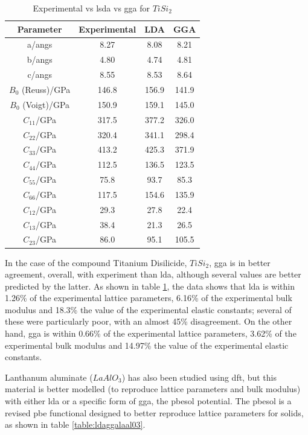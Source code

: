 \begin{table}[h]
\begin{center}
\renewcommand{\arraystretch}{1.2}
\begin{tabular}{c c c c}
\hline\hline
Parameter & Experimental & LDA & GGA  \\
\hline\hline
a/angs & 8.27 & 8.08 & 8.21 \\
b/angs & 4.80 & 4.74 & 4.81 \\
c/angs & 8.55 & 8.53 & 8.64 \\
$B_0$ (Reuss)/GPa & 146.8 & 156.9 & 141.9 \\
$B_0$ (Voigt)/GPa & 150.9 & 159.1 & 145.0 \\
$C_{11}$/GPa & 317.5 & 377.2 & 326.0 \\
$C_{22}$/GPa & 320.4 & 341.1 & 298.4 \\
$C_{33}$/GPa & 413.2 & 425.3 & 371.9 \\
$C_{44}$/GPa & 112.5 & 136.5 & 123.5 \\
$C_{55}$/GPa & 75.8 & 93.7 & 85.3 \\
$C_{66}$/GPa & 117.5 & 154.6 & 135.9 \\
$C_{12}$/GPa & 29.3 & 27.8 & 22.4 \\
$C_{13}$/GPa & 38.4 & 21.3 & 26.5 \\
$C_{23}$/GPa & 86.0 & 95.1 & 105.5 \\
\hline\hline
\end{tabular}
\end{center}
\caption{Experimental vs \acrshort{lsda} vs \acrshort{gga} for $TiSi_2$\cite{dftrfkj}}
\label{table:ldaggatisi2}
\end{table}

In the case of the compound Titanium Disilicide, $TiSi_2$, \acrshort{gga} is in better agreement, overall, with experiment than \acrshort{lda}, although several values are better predicted by the latter.  As shown in table \ref{table:ldaggatisi2}, the data shows that \acrshort{lda} is within 1.26\% of the experimental lattice parameters, 6.16\% of the experimental bulk modulus and 18.3\% the value of the experimental elastic constants; several of these were particularly poor, with an almost 45\% disagreement.  On the other hand, \acrshort{gga} is within 0.66\% of the experimental lattice parameters, 3.62\% of the experimental bulk modulus and 14.97\% the value of the experimental elastic constants\cite{dftrfkj}.

Lanthanum aluminate ($LaAlO_3$) has also been studied using \acrshort{dft}, but this material is better modelled (to reproduce lattice parameters and bulk modulus) with either \acrshort{lda} or a specific form of \acrshort{gga}, the \acrfull{pbesol} potential.  The \acrshort{pbesol} is a revised \acrshort{pbe} functional designed to better reproduce lattice parameters for solids, as shown in table \ref{table:ldaggalaal03}.

